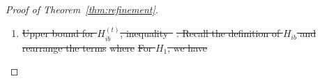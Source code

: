 \documentclass[lettersize,onecolumn,journal]{IEEEtran}
\theoremstyle{definition}
\theoremstyle{definition}
\newcommand{\of}[1]{\left(#1\right)}
\newcommand{\ang}[1]{\left\langle#1\right\rangle}
\providecommand{\DIFdeltex}[1]{{\protect\color{red}\sout{#1}}}                      %
\providecommand{\DIFdel}[1]{\texorpdfstring{\DIFdeltex{#1}}{}} %
\begin{document}
\begin{proof}[Proof of Theorem~\ref{thm:refinement}]
\begin{enumerate}
\item%
\DIFdel{Upper bound for $H_{ib}^{(t)}$, inequality~}%
\DIFdel{. Recall the definition of $H_{ib}$ and rearrange the terms
    }%
\DIFdel{where 
    }%
\DIFdel{For $H_1$, we have 
    }%

\end{enumerate}
\end{proof}
\end{document}
